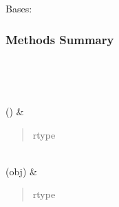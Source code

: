 \documentclass[letterpaper,10pt,english]{sphinxmanual}
\begin{document}
\begin{fulllineitems}
\label{\detokenize{api/seyfert.cosmology.cosmology.H5Cosmology:seyfert.cosmology.cosmology.H5Cosmology}}
\sphinxAtStartPar
Bases: 
\subsubsection*{Methods Summary}


\begin{savenotes}\sphinxatlongtablestart\begin{longtable}[c]{}
\hline

\endfirsthead

%
{}\\
\hline

\endhead

\hline
{}\\
\endfoot

\endlastfoot

\sphinxAtStartPar
{\hyperref[\detokenize{api/seyfert.cosmology.cosmology.H5Cosmology:seyfert.cosmology.cosmology.H5Cosmology.readBuildingData}]{}}()
&
\sphinxAtStartPar
\begin{quote}\begin{description}
\item[{rtype}] \leavevmode
\sphinxAtStartPar
{}

\end{description}\end{quote}

\\
\hline
\sphinxAtStartPar
{\hyperref[\detokenize{api/seyfert.cosmology.cosmology.H5Cosmology:seyfert.cosmology.cosmology.H5Cosmology.writeObjectToFile}]{}}(obj)
&
\sphinxAtStartPar
\begin{quote}\begin{description}
\item[{rtype}] \leavevmode
\sphinxAtStartPar
{}


\end{description}
\end{quote}
\end{longtable}
\end{savenotes}
\end{fulllineitems}
\end{document}
